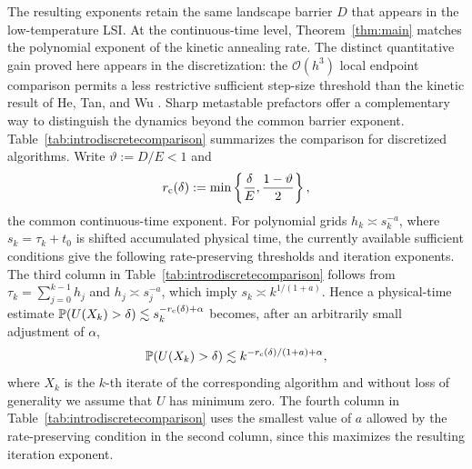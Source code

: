 \documentclass[11pt]{article}
\theoremstyle{definition}
\begin{document}
The resulting exponents retain the same landscape barrier $D$ that appears in the
low-temperature LSI. At the continuous-time level, Theorem~\ref{thm:main} matches
the polynomial exponent of the kinetic annealing rate. The distinct quantitative
gain proved here appears in the discretization: the $\mathcal{O}(h^3)$ local endpoint
comparison permits a less restrictive sufficient step-size threshold than the
kinetic result of He, Tan, and Wu \cite{HeTanWu2024}. Sharp metastable prefactors offer a
complementary way to distinguish the dynamics beyond the common barrier exponent.
Table~\ref{tab:introdiscretecomparison} summarizes the comparison for discretized algorithms.
Write $\vartheta:=D/E<1$ and
\[
 r_{\rm c}(\delta):=\min\left\{\frac{\delta}{E},
                         \frac{1-\vartheta}{2}\right\},
\]
the common continuous-time exponent. For polynomial grids
$h_k\asymp s_k^{-a}$, where $s_k=\tau_k+t_0$ is shifted accumulated physical
time, the currently available sufficient conditions give the following
rate-preserving thresholds
and iteration exponents.
The third column in Table~\ref{tab:introdiscretecomparison} follows from
$\tau_k=\sum_{j=0}^{k-1}h_j$ and $h_j\asymp s_j^{-a}$, which imply
$s_k\asymp k^{1/(1+a)}$. Hence a physical-time estimate
$\mathbb P(U(X_k)>\delta)\lesssim s_k^{-r_{\rm c}(\delta)+\alpha}$
becomes, after an arbitrarily small adjustment of $\alpha$,
\[
 \mathbb P(U(X_k)>\delta)
 \lesssim k^{-r_{\rm c}(\delta)/(1+a)+\alpha},
\]
where $X_{k}$ is the $k$-th iterate of the corresponding algorithm and without loss of generality we assume that
$U$ has minimum zero.
The fourth column in Table~\ref{tab:introdiscretecomparison} uses the smallest value of $a$ allowed by the
rate-preserving condition in the second column, since this maximizes the
resulting iteration exponent.
\end{document}
